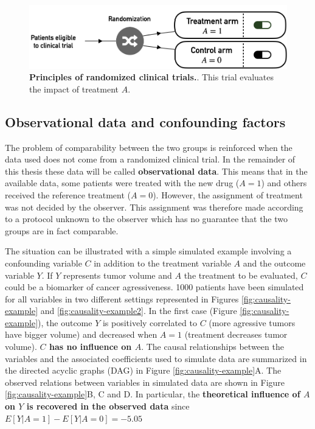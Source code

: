 \documentclass[a4paper,12pt,twoside,onecolumn,openright,final,oldfontcommands]{memoir}
\begin{document}
\begin{figure}

{\centering \includegraphics[width=0.9\linewidth]{fig/trials} 

}

\caption[Principles of randomized clinical]{\textbf{Principles of randomized clinical trials.}.
This trial evaluates the impact of treatment \(A\).}\label{fig:trials}
\end{figure}




\subsection{Observational data and confounding
factors}\label{observational-data-and-confounding-factors}

The problem of comparability between the two groups is reinforced when
the data used does not come from a randomized clinical trial. In the
remainder of this thesis these data will be called \textbf{observational
data}. This means that in the available data, some patients were treated
with the new drug (\(A=1\)) and others received the reference treatment
(\(A=0\)). However, the assignment of treatment was not decided by the
observer. This assignment was therefore made according to a protocol
unknown to the observer which has no guarantee that the two groups are
in fact comparable.

The situation can be illustrated with a simple simulated example
involving a confounding variable \(C\) in addition to the treatment
variable \(A\) and the outcome variable \(Y\). If \(Y\) represents tumor
volume and \(A\) the treatment to be evaluated, \(C\) could be a
biomarker of cancer agressiveness. 1000 patients have been simulated for
all variables in two different settings represented in Figures
\ref{fig:causality-example} and \ref{fig:causality-example2}. In the
first case (Figure \ref{fig:causality-example}), the outcome \(Y\) is
positively correlated to \(C\) (more agressive tumors have bigger
volume) and decreased when \(A=1\) (treatment decreases tumor volume).
\textbf{\(C\) has no influence on \(A\)}. The causal relationships
between the variables and the associated coefficients used to simulate
data are summarized in the directed acyclic graphs (DAG) in Figure
\ref{fig:causality-example}A. The observed relations between variables
in simulated data are shown in Figure \ref{fig:causality-example}B, C
and D. In particular, the \textbf{theoretical influence of \(A\) on
\(Y\) is recovered in the observed data} since
\(E[Y|A=1]-E[Y|A=0]=-5.05\)
\end{document}
